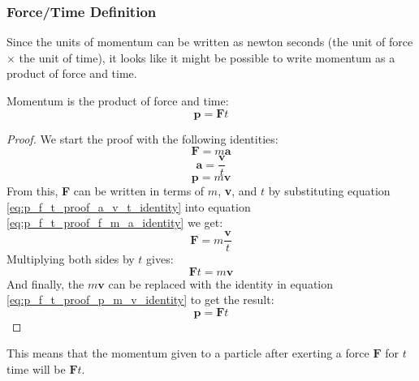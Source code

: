        \subsubsection{Force/Time Definition}
        Since the units of \gls{momentum} can be written as \gls{newton} \glspl{second} (the unit of force $\times$ the unit of time), it looks like it might be possible to write momentum as a product of force and time.
        \begin{theorem}
            Momentum is the product of \gls{force} and \gls{time}:
            \normalfont\begin{equation}
                \textbf{p}=\textbf{F}t
            \end{equation}
        \end{theorem}
        \begin{proof}
            We start the proof with the following identities:
            \begin{equation} \label{eq:p_f_t_proof_f_m_a_identity}
                \textbf{F}=m\textbf{a}
            \end{equation}
            \begin{equation} \label{eq:p_f_t_proof_a_v_t_identity}
                \textbf{a}=\frac{\textbf{v}}{t}
            \end{equation}
            \begin{equation} \label{eq:p_f_t_proof_p_m_v_identity}
                \textbf{p}=m\textbf{v}
            \end{equation}
            From this, \textbf{F} can be written in terms of $m$, \textbf{v}, and $t$ by substituting equation \ref{eq:p_f_t_proof_a_v_t_identity} into equation \ref{eq:p_f_t_proof_f_m_a_identity} we get:
            \begin{equation*}
                \textbf{F}=m\frac{\textbf{v}}{t}
            \end{equation*}
            Multiplying both sides by $t$ gives:
            \begin{equation*}
                \textbf{F}t=m\textbf{v}
            \end{equation*}
            And finally, the $m\textbf{v}$ can be replaced with the identity in equation \ref{eq:p_f_t_proof_p_m_v_identity} to get the result:
            \begin{equation*}
                \textbf{p}=\textbf{F}t
            \end{equation*}
        \end{proof}
        This means that the \gls{momentum} given to a particle after exerting a force $\textbf{F}$ for $t$ time will be $\textbf{F}t$.

